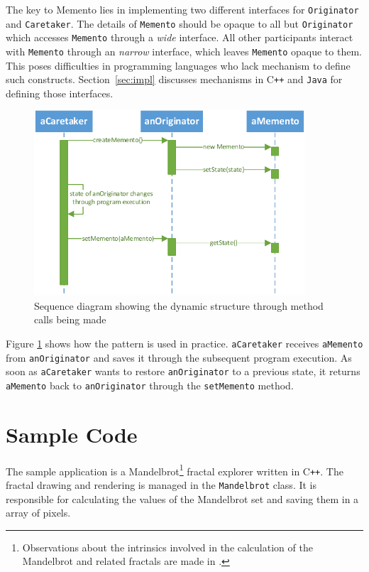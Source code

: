 \documentclass[11pt, a4paper, twoside]{article}
\def\cpp{C{}\texttt{++}}
\begin{document}
	The key to Memento lies in implementing two different interfaces for \verb|Originator| and \verb|Caretaker|. The details of \verb|Memento| should be opaque to all but \verb|Originator| which accesses \verb|Memento| through a \emph{wide} interface. All other participants interact with \verb|Memento| through an \emph{narrow} interface, which leaves \verb|Memento| opaque to them. This poses difficulties in programming languages who lack mechanism to define such constructs. Section~\ref{sec:impl} discusses mechanisms in \cpp{} and \verb|Java| for defining those interfaces.
	
	\begin{figure}[htb]
		\begin{center}
			\includegraphics[width=0.9\textwidth]{sequence_diagram.pdf}
			\caption{Sequence diagram showing the dynamic structure through method calls being made}
			\label{fig:sequence}
		\end{center}
	\end{figure}
	
	Figure \ref{fig:sequence} shows how the pattern is used in practice. \verb|aCaretaker| receives \verb|aMemento| from \verb|anOriginator| and saves it through the subsequent program execution. As soon as \verb|aCaretaker| wants to restore \verb|anOriginator| to a previous state, it returns \verb|aMemento| back to \verb|anOriginator| through the \verb|setMemento| method.
	
	
	\section{Sample Code}
	The sample application is a Mandelbrot\footnote{Observations about the intrinsics involved in the calculation of the Mandelbrot and related fractals are made in \cite{mandelbrot1980fractal}.} fractal explorer written in \cpp. The fractal drawing and rendering is managed in the \verb|Mandelbrot| class. It is responsible for calculating the values of the Mandelbrot set and saving them in a array of pixels.
	
\end{document}
